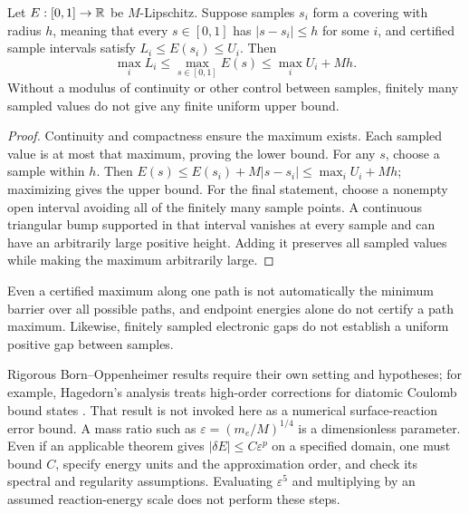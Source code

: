 \begin{proposition}
\label{prop:path}
Let $E:[0,1]\to\mathbb{R}$ be $M$-Lipschitz. Suppose samples $s_i$ form a
covering with radius $h$, meaning that every $s\in[0,1]$ has
$|s-s_i|\le h$ for some $i$, and certified sample intervals satisfy
$L_i\le E(s_i)\le U_i$. Then
\begin{equation}
 \max_i L_i\le\max_{s\in[0,1]} E(s)\le\max_i U_i+Mh.
 \label{eq:path}
\end{equation}
Without a modulus of continuity or other control between samples, finitely
many sampled values do not give any finite uniform upper bound.
\end{proposition}
\begin{proof}
Continuity and compactness ensure the maximum exists. Each sampled value is
at most that maximum, proving the lower bound. For any $s$, choose a
sample within $h$. Then
$E(s)\le E(s_i)+M|s-s_i|\le\max_i U_i+Mh$; maximizing gives the
upper bound. For the final statement, choose a nonempty open interval
avoiding all of the finitely many sample points. A continuous triangular
bump supported in that interval vanishes at every sample and can have an
arbitrarily large positive height. Adding it preserves all sampled values
while making the maximum arbitrarily large.
\end{proof}

Even a certified maximum along one path is not automatically the minimum
barrier over all possible paths, and endpoint energies alone do not certify
a path maximum. Likewise, finitely sampled electronic gaps do not establish
a uniform positive gap between samples.

Rigorous Born--Oppenheimer results require their own setting and hypotheses;
for example, Hagedorn's analysis treats high-order corrections for diatomic
Coulomb bound states \citep{Hagedorn1988}. That result is not invoked here
as a numerical surface-reaction error bound. A mass ratio such as
$\varepsilon=(m_e/M)^{1/4}$ is a dimensionless parameter. Even if an
applicable theorem gives $|\delta E|\le C\varepsilon^p$ on a specified
domain, one must bound $C$, specify energy units and the approximation order,
and check its spectral and regularity assumptions. Evaluating
$\varepsilon^5$ and multiplying by an assumed reaction-energy scale does
not perform these steps.

